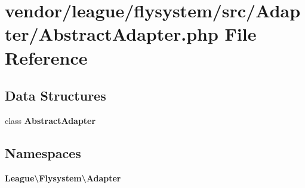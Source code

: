 \section{vendor/league/flysystem/src/\+Adapter/\+Abstract\+Adapter.php File Reference}
\label{league_2flysystem_2src_2_adapter_2_abstract_adapter_8php}
\subsection*{Data Structures}
\begin{DoxyCompactItemize}
\item 
class {\bf Abstract\+Adapter}
\end{DoxyCompactItemize}
\subsection*{Namespaces}
\begin{DoxyCompactItemize}
\item 
 {\bf League\textbackslash{}\+Flysystem\textbackslash{}\+Adapter}
\end{DoxyCompactItemize}
